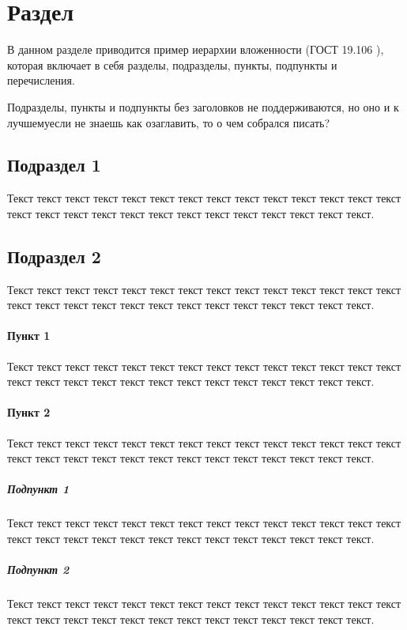 \section{Раздел}

В данном разделе приводится пример иерархии вложенности (ГОСТ 19.106 \cite{gost19_106}), которая включает в себя разделы, подразделы, пункты, подпункты и перечисления.

Подразделы, пункты и подпункты без заголовков не поддерживаются, но оно и к лучшему\mdash если не знаешь как озаглавить, то о чем собрался писать?

\subsection{Подраздел 1}
Текст текст текст текст текст текст текст текст текст текст текст текст текст текст текст текст текст текст текст текст текст текст текст текст текст текст текст.

\subsection{Подраздел 2}
Текст текст текст текст текст текст текст текст текст текст текст текст текст текст текст текст текст текст текст текст текст текст текст текст текст текст текст.

\paragraph{Пункт 1} 
Текст текст текст текст текст текст текст текст текст текст текст текст текст текст текст текст текст текст текст текст текст текст текст текст текст текст текст.

\paragraph{Пункт 2} 
Текст текст текст текст текст текст текст текст текст текст текст текст текст текст текст текст текст текст текст текст текст текст текст текст текст текст текст.

\subparagraph{Подпункт 1} 
Текст текст текст текст текст текст текст текст текст текст текст текст текст текст текст текст текст текст текст текст текст текст текст текст текст текст текст.

\subparagraph{Подпункт 2} 
Текст текст текст текст текст текст текст текст текст текст текст текст текст текст текст текст текст текст текст текст текст текст текст текст текст текст текст.

